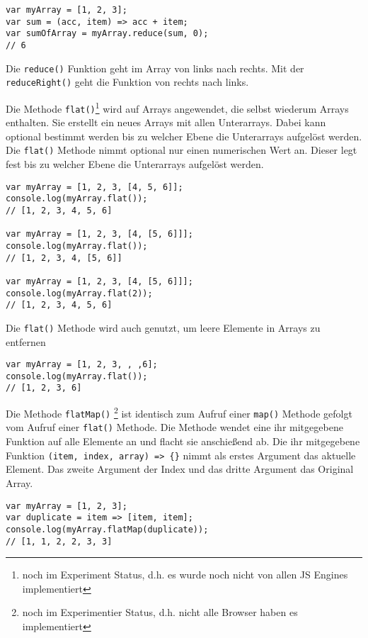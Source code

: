 \documentclass[babel]{book}
\begin{document}
\begin{lstlisting}[caption=Array Konstruktor]
var myArray = [1, 2, 3];
var sum = (acc, item) => acc + item;
var sumOfArray = myArray.reduce(sum, 0);
// 6
\end{lstlisting}

Die \lstinline|reduce()| Funktion geht im Array von links nach rechts. Mit der \lstinline|reduceRight()| geht die Funktion von rechts nach links.

Die Methode \lstinline|flat()|\footnote{noch im Experiment Status, d.h. es wurde noch nicht von allen JS Engines implementiert} wird auf Arrays angewendet, die selbst wiederum Arrays enthalten. Sie erstellt ein neues Arrays mit allen Unterarrays. Dabei kann optional bestimmt werden bis zu welcher Ebene die Unterarrays aufgelöst werden. Die \lstinline|flat()| Methode nimmt optional nur einen numerischen Wert an. Dieser legt fest bis zu welcher Ebene die Unterarrays aufgelöst werden.

\begin{lstlisting}[caption=Array Konstruktor]
var myArray = [1, 2, 3, [4, 5, 6]];
console.log(myArray.flat());
// [1, 2, 3, 4, 5, 6]

var myArray = [1, 2, 3, [4, [5, 6]]];
console.log(myArray.flat());
// [1, 2, 3, 4, [5, 6]]

var myArray = [1, 2, 3, [4, [5, 6]]];
console.log(myArray.flat(2));
// [1, 2, 3, 4, 5, 6]

\end{lstlisting}

Die \lstinline|flat()| Methode wird auch genutzt, um leere Elemente in Arrays zu entfernen
\begin{lstlisting}[caption=Array Konstruktor]
var myArray = [1, 2, 3, , ,6];
console.log(myArray.flat());
// [1, 2, 3, 6]
\end{lstlisting}

Die Methode \lstinline|flatMap()| \footnote{noch im Experimentier Status, d.h. nicht alle Browser haben es implementiert} ist identisch zum Aufruf einer \lstinline|map()| Methode gefolgt vom Aufruf einer \lstinline|flat()| Methode. Die Methode wendet eine ihr mitgegebene Funktion auf alle Elemente an und flacht sie anschießend ab. Die ihr mitgegebene Funktion \lstinline|(item, index, array) => {}| nimmt als erstes Argument das aktuelle Element. Das zweite Argument der Index und das dritte Argument das Original Array.

\begin{lstlisting}[caption=Array Konstruktor]
var myArray = [1, 2, 3];
var duplicate = item => [item, item];
console.log(myArray.flatMap(duplicate));
// [1, 1, 2, 2, 3, 3]
\end{lstlisting}
\end{document}
